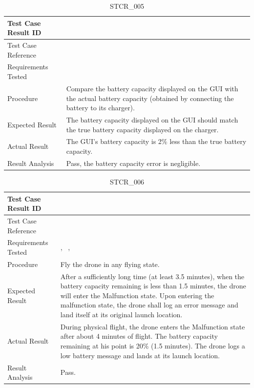 \documentclass[12pt, titlepage]{article}
\begin{document}
\begin{table}[!h]
\begin{center}
\caption {STCR\_005}
\label{tab:STCR_005}
\begin{tabular}{ | m{3.2cm} | m{12.2cm} | } 
\hline
Test Case Result ID & \nameref{tab:STCR_005} \\ 
\hline
Test Case Reference & \nameref{tab:STC_005}  \\ 
\hline
Requirements Tested & \nameref{SR_003} \\ 
\hline
Procedure & Compare the battery capacity displayed on the GUI with the actual battery capacity (obtained by connecting the battery to its charger).  \\ 
\hline
Expected Result & The battery capacity displayed on the GUI should match the true battery capacity displayed on the charger.   \\ 
\hline
Actual Result & The GUI's battery capacity is 2\% less than the true battery capacity.  \\ 
\hline
Result Analysis & Pass, the battery capacity error is negligible.  \\ 
\hline
\end{tabular}
\end{center}
\end{table}

\begin{table}[!h]
\begin{center}
\caption {STCR\_006}
\label{tab:STCR_006}
\begin{tabular}{ | m{3.2cm} | m{12.2cm} | } 
\hline
Test Case Result ID & \nameref{tab:STCR_006} \\ 
\hline
Test Case Reference & \nameref{tab:STC_006}  \\ 
\hline
Requirements Tested & \nameref{SR_011}, \nameref{STA_009}\, \nameref{USE_003}, \nameref{SR_003}
\\  
\hline
Procedure &  Fly the drone in any flying state.  \\ 
\hline
Expected Result & After a sufficiently long time (at least 3.5 minutes), when the battery capacity remaining is less than 1.5 minutes, the drone will enter the Malfunction state. Upon entering the malfunction state, the drone shall log an error message and land itself at its original launch location.   \\ 
\hline
Actual Result & During physical flight, the drone enters the Malfunction state after about 4 minutes of flight. The battery capacity remaining at his point is 20\% (1.5 minutes). The drone logs a low battery message and lands at its launch location. \\ 
\hline
Result Analysis & Pass.  \\ 
\hline
\end{tabular}
\end{center}
\end{table}
\end{document}
